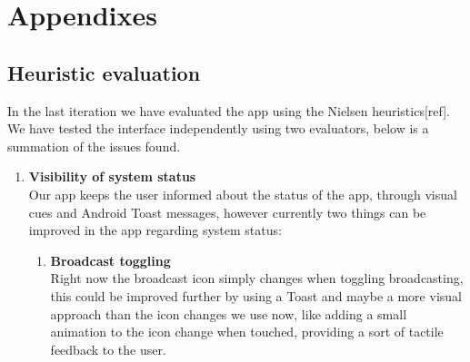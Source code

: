 \documentclass[runningheads,a4paper]{llncs}
\begin{document}
\section*{Appendixes}

\subsection*{Heuristic evaluation}
In the last iteration we have evaluated the app using the Nielsen heuristics[ref].
We have tested the interface independently using two evaluators, below is a summation of the issues found.\\


\begin{enumerate}
  \item \textbf{Visibility of system status}\\
  Our app keeps the user informed about the status of the app, through visual cues and Android Toast messages, however currently two things can be improved in the app regarding system status:
  \begin{enumerate}
    \item \textbf{Broadcast toggling}\\
    Right now the broadcast icon simply changes when toggling broadcasting, this could be improved further by using a Toast and maybe a more visual approach than the icon changes we use now, like adding a small animation to the icon change when touched, providing a sort of tactile feedback to the user.
    

\end{enumerate}
\end{enumerate}
\end{document}

